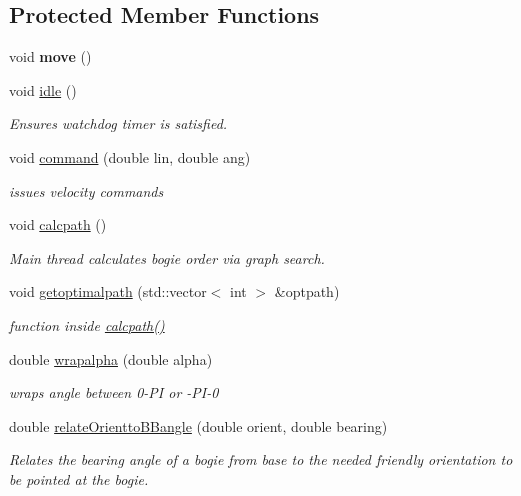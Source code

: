 \subsection*{Protected Member Functions}
\begin{DoxyCompactItemize}
\item 
\mbox{\label{classControl_a11fd8f10f43a8375262c0b1cc34d73ff}} 
void {\bfseries move} ()
\item 
\mbox{\label{classControl_a4e088c3e3a959fa80b2055a615ee946e}} 
void \hyperlink{classControl_a4e088c3e3a959fa80b2055a615ee946e}{idle} ()
\begin{DoxyCompactList}\small\item\em Ensures watchdog timer is satisfied. \end{DoxyCompactList}\item 
void \hyperlink{classControl_aa18094ca515f8dbcdff94e0b7a60a88a}{command} (double lin, double ang)
\begin{DoxyCompactList}\small\item\em issues velocity commands \end{DoxyCompactList}\item 
void \hyperlink{classControl_a9bfe498567206c176b0e23d71708d6e3}{calcpath} ()
\begin{DoxyCompactList}\small\item\em Main thread calculates bogie order via graph search. \end{DoxyCompactList}\item 
void \hyperlink{classControl_af846dd07501030d430893f17cd4a4178}{getoptimalpath} (std\+::vector$<$ int $>$ \&optpath)
\begin{DoxyCompactList}\small\item\em function inside \hyperlink{classControl_a9bfe498567206c176b0e23d71708d6e3}{calcpath()} \end{DoxyCompactList}\item 
double \hyperlink{classControl_a57ae0e13099f01e27fe5afc0765bc611}{wrapalpha} (double alpha)
\begin{DoxyCompactList}\small\item\em wraps angle between 0-\/\+PI or -\/\+P\+I-\/0 \end{DoxyCompactList}\item 
double \hyperlink{classControl_a3535c9d84af21822fe3b5318391092b1}{relate\+Orientto\+B\+Bangle} (double orient, double bearing)
\begin{DoxyCompactList}\small\item\em Relates the bearing angle of a bogie from base to the needed friendly orientation to be pointed at the bogie. \end{DoxyCompactList}\item 

\end{DoxyCompactItemize}
